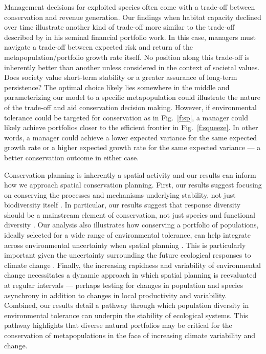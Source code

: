 Management decisions for exploited species often come with a trade-off between conservation and revenue generation. Our findings when habitat capacity declined over time illustrate another kind of trade-off more similar to the trade-off described by \citet{markowitz1952} in his seminal financial portfolio work. In this case, managers must navigate a trade-off between expected risk and return of the metapopulation/portfolio growth rate itself. No position along this trade-off is inherently better than another unless considered in the context of societal values. Does society value short-term stability or a greater assurance of long-term persistence? The optimal choice likely lies somewhere in the middle and parameterizing our model to a specific metapopulation could illustrate the nature of the trade-off and aid conservation decision making. However, if environmental tolerance could be targeted for conservation as in Fig.~\ref{f:sp}, a manager could likely achieve portfolios closer to the efficient frontier in Fig.~\ref{f:squeeze}. In other words, a manager could achieve a lower expected variance for the same expected growth rate or a higher expected growth rate for the same expected variance --- a better conservation outcome in either case.

Conservation planning is inherently a spatial activity \citep{pressey2007} and our results can inform how we approach spatial conservation planning. First, our results suggest focusing on conserving the processes and mechanisms underlying stability, not just biodiversity itself \citep{pressey2007, beechie2013}. In particular, our results suggest that response diversity should be a mainstream element of conservation, not just species and functional diversity \citep{mori2013}. Our analysis also illustrates how conserving a portfolio of populations, ideally selected for a wide range of environmental tolerance, can help integrate across environmental uncertainty when spatial planning \citep{ando2012}. This is particularly important given the uncertainty surrounding the future ecological responses to climate change \citep{walther2002}. Finally, the increasing rapidness and variability of environmental change necessitates a dynamic approach in which spatial planning is reevaluated at regular intervals \citep{hannah2002a} --- perhaps testing for changes in population and species asynchrony in addition to changes in local productivity and variability. Combined, our results detail a pathway through which population diversity in environmental tolerance can underpin the stability of ecological systems. This pathway highlights that diverse natural portfolios may be critical for the conservation of metapopulations in the face of increasing climate variability and change.

